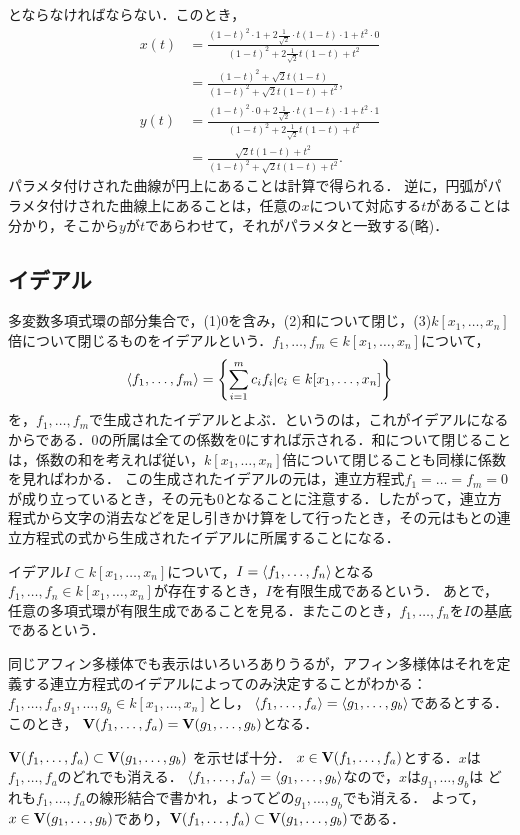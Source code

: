 \documentclass[9pt]{ltjsarticle}
\begin{document}
\begin{enumerate}[label=(問題\arabic*)]
とならなければならない．このとき，
\begin{align}
 x(t)&=
\frac{(1-t)^2\cdot 1 + 2\frac{1}{\sqrt{2}}\cdot t(1-t)\cdot 1 + t^2 \cdot 0}{(1-t)^2 + 2\frac{1}{\sqrt{2}}t(1-t)+t^2}\\
 & =
\frac{(1-t)^2 + \sqrt{2}t(1-t)}{(1-t)^2 + \sqrt{2}t(1-t)+t^2},\\
 y(t)& =
\frac{(1-t)^2 \cdot 0 + 2\frac{1}{\sqrt{2}}\cdot t(1-t)\cdot 1 + t^2 \cdot 1}{(1-t)^2 + 2\frac{1}{\sqrt{2}}t(1-t)+t^2}\\
 & =
\frac{\sqrt{2}t(1-t)+t^2}{(1-t)^2 + \sqrt{2}t(1-t) + t^2}.
\end{align}
パラメタ付けされた曲線が円上にあることは計算で得られる．
逆に，円弧がパラメタ付けされた曲線上にあることは，任意の$x$について対応する$t$があることは分かり，そこから$y$が$t$であらわせて，それがパラメタと一致する(略)．
\end{enumerate}

\subsection{イデアル}
多変数多項式環の部分集合で，(1)0を含み，(2)和について閉じ，(3)$k[x_1,\dots,x_n]$倍について閉じるものをイデアルという．$f_1,\dots,f_m \in k[x_1,\dots,x_n]$について，
\begin{align}
 \left\langle f_1,\dots,f_m \right\rangle = \left\{\sum_{i=1}^m c_i f_i | c_i \in k[x_1,\dots,x_n]\right\}
\end{align}
を，$f_1,\dots,f_m$で生成されたイデアルとよぶ．というのは，これがイデアルになるからである．0の所属は全ての係数を0にすれば示される．和について閉じることは，係数の和を考えれば従い，$k[x_1,\dots,x_n]$倍について閉じることも同様に係数を見ればわかる．
この生成されたイデアルの元は，連立方程式$f_1=\dots = f_m = 0$が成り立っているとき，その元も0となることに注意する．したがって，連立方程式から文字の消去などを足し引きかけ算をして行ったとき，その元はもとの連立方程式の式から生成されたイデアルに所属することになる．

イデアル$I \subset k[x_1,\dots,x_n]$について，$I=\left\langle f_1,\dots,f_n \right\rangle$となる$f_1,\dots, f_n \in k[x_1,\dots,x_n]$が存在するとき，$I$を有限生成であるという．
あとで，任意の多項式環が有限生成であることを見る．またこのとき，$f_1,\dots,f_n$を$I$の基底であるという．

同じアフィン多様体でも表示はいろいろありうるが，アフィン多様体はそれを定義する連立方程式のイデアルによってのみ決定することがわかる：
$f_1,\dots,f_a,g_1,\dots,g_b \in k[x_1,\dots,x_n]$とし，
$\left\langle f_1,\dots,f_a \right\rangle=\left\langle g_1,\dots,g_b \right\rangle$であるとする．このとき，
$\textbf V(f_1,\dots,f_a)=\textbf V(g_1,\dots,g_b)$となる．
\begin{myproof}
$\textbf V(f_1,\dots,f_a)\subset \textbf V(g_1,\dots,g_b)$ を示せば十分．
$x\in\textbf V(f_1,\dots,f_a)$とする．$x$は$f_1,\dots,f_a$のどれでも消える．
$\left\langle f_1,\dots,f_a \right\rangle=\left\langle g_1,\dots,g_b \right\rangle$なので，$x$は$g_1,\dots,g_b$は
どれも$f_1,\dots,f_a$の線形結合で書かれ，よってどの$g_1,\dots,g_b$でも消える．
よって，$x\in \textbf V(g_1,\dots,g_b)$であり，$\textbf V(f_1,\dots,f_a)\subset \textbf V(g_1,\dots,g_b)$である．
\end{myproof}
\end{document}
